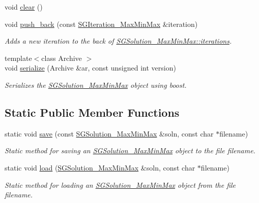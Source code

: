 \begin{DoxyCompactItemize}
void \hyperlink{classSGSolution__MaxMinMax_a486859659ba8ae3ee1d38403a158236a}{clear} ()
\item 
\mbox{\label{classSGSolution__MaxMinMax_a66ee7794c55d4c795c7c3e7ee0c86658}} 
void \hyperlink{classSGSolution__MaxMinMax_a66ee7794c55d4c795c7c3e7ee0c86658}{push\+\_\+back} (const \hyperlink{classSGIteration__MaxMinMax}{S\+G\+Iteration\+\_\+\+Max\+Min\+Max} \&iteration)
\begin{DoxyCompactList}\small\item\em Adds a new iteration to the back of \hyperlink{classSGSolution__MaxMinMax_a119ccef307a2964b6b16e8ba2af547fd}{S\+G\+Solution\+\_\+\+Max\+Min\+Max\+::iterations}. \end{DoxyCompactList}\item 
\mbox{\label{classSGSolution__MaxMinMax_af116b55bb38d2b727802e34a8873d6ea}} 
{\footnotesize template$<$class Archive $>$ }\\void \hyperlink{classSGSolution__MaxMinMax_af116b55bb38d2b727802e34a8873d6ea}{serialize} (Archive \&ar, const unsigned int version)
\begin{DoxyCompactList}\small\item\em Serializes the \hyperlink{classSGSolution__MaxMinMax}{S\+G\+Solution\+\_\+\+Max\+Min\+Max} object using boost. \end{DoxyCompactList}\end{DoxyCompactItemize}
\subsection*{Static Public Member Functions}
\begin{DoxyCompactItemize}
\item 
\mbox{\label{classSGSolution__MaxMinMax_a1965d607757c0b8be41f1a68f0d29438}} 
static void \hyperlink{classSGSolution__MaxMinMax_a1965d607757c0b8be41f1a68f0d29438}{save} (const \hyperlink{classSGSolution__MaxMinMax}{S\+G\+Solution\+\_\+\+Max\+Min\+Max} \&soln, const char $\ast$filename)
\begin{DoxyCompactList}\small\item\em Static method for saving an \hyperlink{classSGSolution__MaxMinMax}{S\+G\+Solution\+\_\+\+Max\+Min\+Max} object to the file filename. \end{DoxyCompactList}\item 
\mbox{\label{classSGSolution__MaxMinMax_a79b383dcf65095dcccabe18744a733cc}} 
static void \hyperlink{classSGSolution__MaxMinMax_a79b383dcf65095dcccabe18744a733cc}{load} (\hyperlink{classSGSolution__MaxMinMax}{S\+G\+Solution\+\_\+\+Max\+Min\+Max} \&soln, const char $\ast$filename)
\begin{DoxyCompactList}\small\item\em Static method for loading an \hyperlink{classSGSolution__MaxMinMax}{S\+G\+Solution\+\_\+\+Max\+Min\+Max} object from the file filename. \end{DoxyCompactList}\end{DoxyCompactItemize}
